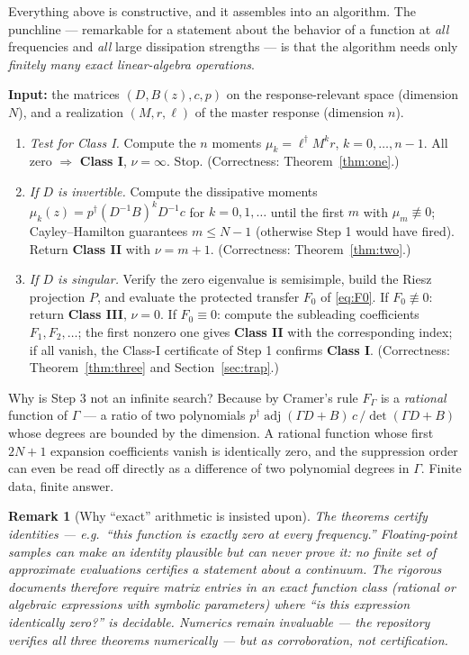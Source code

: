 \documentclass[11pt]{article}
\newtheorem{remark}{Remark}
\newcommand{\adj}{\operatorname{adj}}
\begin{document}
Everything above is constructive, and it assembles into an algorithm.  The
punchline --- remarkable for a statement about the behavior of a function at
\emph{all} frequencies and \emph{all} large dissipation strengths --- is that
the algorithm needs only \emph{finitely many exact linear-algebra
operations}.

\medskip
\noindent\textbf{Input:} the matrices $(D,B(z),c,p)$ on the response-relevant
space (dimension $N$), and a realization $(M,r,\ell)$ of the master response
(dimension $n$).

\begin{enumerate}
\item[\textbf{Step 1.}] \emph{Test for Class I.}  Compute the $n$ moments
$\mu_k=\ell^\dagger M^k r$, $k=0,\dots,n-1$.  All zero $\Rightarrow$
\textbf{Class I}, $\nu=\infty$.  Stop.  (Correctness: Theorem~\ref{thm:one}.)
\item[\textbf{Step 2.}] \emph{If $D$ is invertible.}  Compute the dissipative
moments $\mu_k(z)=p^\dagger(D^{-1}B)^kD^{-1}c$ for $k=0,1,\dots$ until the
first $m$ with $\mu_m\not\equiv0$; Cayley--Hamilton guarantees $m\le N-1$
(otherwise Step 1 would have fired).  Return \textbf{Class II} with
$\nu=m+1$.  (Correctness: Theorem~\ref{thm:two}.)
\item[\textbf{Step 3.}] \emph{If $D$ is singular.}  Verify the zero
eigenvalue is semisimple, build the Riesz projection $P$, and evaluate the
protected transfer $F_0$ of \eqref{eq:F0}.  If $F_0\not\equiv0$: return
\textbf{Class III}, $\nu=0$.  If $F_0\equiv0$: compute the subleading
coefficients $F_1,F_2,\dots$; the first nonzero one gives \textbf{Class II}
with the corresponding index; if all vanish, the Class-I certificate of
Step 1 confirms \textbf{Class I}.  (Correctness: Theorem~\ref{thm:three} and
Section~\ref{sec:trap}.)
\end{enumerate}

Why is Step 3 not an infinite search?  Because by Cramer's rule
$F_\Gamma$ is a \emph{rational} function of $\Gamma$ ---
a ratio of two polynomials
$p^\dagger\adj(\Gamma D+B)\,c\,/\det(\Gamma D+B)$
whose degrees are bounded by the dimension.  A rational function whose first
$2N{+}1$ expansion coefficients vanish is identically zero, and the
suppression order can even be read off directly as a difference of two
polynomial degrees in $\Gamma$.  Finite data, finite answer.

\begin{remark}[Why ``exact'' arithmetic is insisted upon]
The theorems certify \emph{identities} --- e.g.\ ``this function is exactly
zero at every frequency.''  Floating-point samples can make an identity
plausible but can never prove it: no finite set of approximate evaluations
certifies a statement about a continuum.  The rigorous documents therefore
require matrix entries in an exact function class (rational or algebraic
expressions with symbolic parameters) where ``is this expression identically
zero?'' is decidable.  Numerics remain invaluable --- the repository verifies
all three theorems numerically --- but as \emph{corroboration}, not
certification.
\end{remark}
\end{document}
